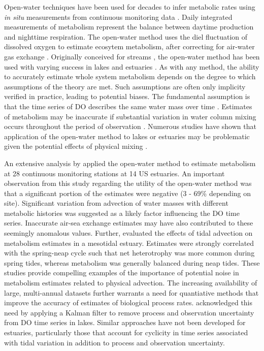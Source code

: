 \documentclass[letterpaper,12pt,oneside]{article}\usepackage[]{graphicx}\usepackage[]{color}
\begin{document}
Open-water techniques have been used for decades to infer metabolic rates using \textit{in situ} measurements from continuous monitoring data \citep{Odum56}. Daily integrated measurements of metabolism represent the balance between daytime production and nighttime respiration.  The open-water method uses the diel fluctuation of dissolved oxygen to estimate ecosytem metabolism, after correcting for air-water gas exchange \citep{Kemp12}.  Originally conceived for streams \citep{Odum56}, the open-water method has been used with varying success in lakes \citep{Staehr10,Coloso11,Batt12} and estuaries \citep{Caffrey04,Russell07,Caffrey13}.  As with any method, the ability to accurately estimate whole system metabolism depends on the degree to which assumptions of the theory are met.  Such assumptions are often only implicity verified in practice, leading to potential biases.  The fundamental assumption is that the time series of \ac{DO} describes the same water mass over time \citep{Needoba12}.  Estimates of metabolism may be inaccurate if substantial variation in water column mixing occurs throughout the period of observation \citep{Russell07}.  Numerous studies have shown that application of the open-water method to lakes or estuaries may be problematic given the potential effects of physical mixing \citep{Ziegler98,Caffrey03,Coloso11,Batt12,Nidzieko14}.  

An extensive analysis by \citet{Caffrey03} applied the open-water method to estimate metabolism at 28 continuous monitoring stations at 14 US estuaries.  An important observation from this study regarding the utility of the open-water method was that a significant portion of the estimates were negative (3 - 69\% depending on site). Significant variation from advection of water masses with different metabolic histories was suggested as a likely factor influencing the \ac{DO} time series. Inaccurate air-sea exchange estimates may have also contributed to these seemingly anomalous values.  Further, \citet{Nidzieko14} evaluated the effects of tidal advection on metabolism estimates in a mesotidal estuary.  Estimates were strongly correlated with the spring-neap cycle such that net heterotrophy was more common during spring tides, whereas metabolism was generally balanced during neap tides. These studies provide compelling examples of the importance of potential noise in metabolism estimates related to physical advection.  The increasing availability of large, multi-annual datasets further warrants a need for quantiative methods that improve the accuracy of estimates of biological process rates.  \citet{Batt12} acknowledged this need by applying a Kalman filter \citep{Harvey89} to remove process and observation uncertainty from \ac{DO} time series in lakes.  Similar approaches have not been developed for estuaries, particularly those that account for cyclicity in time series associated with tidal variation in addition to process and observation uncertainty.
\end{document}
